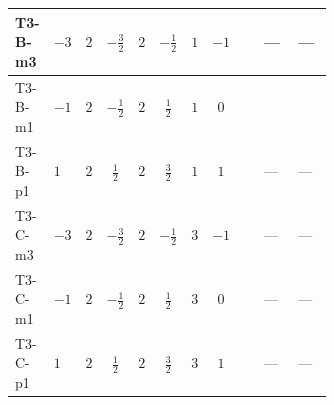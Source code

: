 \documentclass[8pt]{article}
\begin{document}
\begin{landscape}
\begin{longtable}{@{}llcccccc >{\raggedright\arraybackslash}p{0.21\linewidth} >{\raggedright\arraybackslash}p{0.21\linewidth} >{\raggedright\arraybackslash}p{0.21\linewidth}@{}}
\midrule
T3-B-m3 & $-3$ & $2$ & $-\frac{3}{2}$ & $2$ & $-\frac{1}{2}$ & $1$ & $-1$ & \scriptsize\adjustbox{max width=\linewidth}{$\begin{gathered} -\frac{15}{4} {g_1}^2 \left({y_2}\right)_{ij}\end{gathered}$} & --- & --- \\
\midrule
T3-B-m1 & $-1$ & $2$ & $-\frac{1}{2}$ & $2$ & $\frac{1}{2}$ & $1$ & $0$ & \scriptsize\adjustbox{max width=\linewidth}{$\begin{gathered} -\frac{3}{4} {g_1}^2 \left({y_2}\right)_{ij}\end{gathered}$} & \scriptsize\adjustbox{max width=\linewidth}{$\begin{gathered} \operatorname{Tr}\!\left({y_2}\,\left({y_1}\right)^{\dagger}\right) \left({y_1}\right)_{ij}\end{gathered}$} & \scriptsize\adjustbox{max width=\linewidth}{$\begin{gathered} +\frac{1}{2} (\left({y_1}\,\left({y_1}\right)^{\dagger}\,{y_2}\right)_{ij}+2 \left({y_2}\,\left({y_1}\right)^{\dagger}\,{y_1}\right)_{ij}+\left({Y_e}\,\left({Y_e}\right)^{\dagger}\,{y_2}\right)_{ij}+3 \left({y_2}\,\left({y_2}\right)^{\dagger}\,{y_2}\right)_{ij})\end{gathered}$} \\
\midrule
T3-B-p1 & $1$ & $2$ & $\frac{1}{2}$ & $2$ & $\frac{3}{2}$ & $1$ & $1$ & \scriptsize\adjustbox{max width=\linewidth}{$\begin{gathered} -\frac{15}{4} {g_1}^2 \left({y_2}\right)_{ij}\end{gathered}$} & --- & --- \\
\midrule
T3-C-m3 & $-3$ & $2$ & $-\frac{3}{2}$ & $2$ & $-\frac{1}{2}$ & $3$ & $-1$ & \scriptsize\adjustbox{max width=\linewidth}{$\begin{gathered} -\frac{15}{4} {g_1}^2 \left({y_2}\right)_{ij}\end{gathered}$} & --- & --- \\
\midrule
T3-C-m1 & $-1$ & $2$ & $-\frac{1}{2}$ & $2$ & $\frac{1}{2}$ & $3$ & $0$ & \scriptsize\adjustbox{max width=\linewidth}{$\begin{gathered} -\frac{3}{4} {g_1}^2 \left({y_2}\right)_{ij}\end{gathered}$} & --- & --- \\
\midrule
T3-C-p1 & $1$ & $2$ & $\frac{1}{2}$ & $2$ & $\frac{3}{2}$ & $3$ & $1$ & \scriptsize\adjustbox{max width=\linewidth}{$\begin{gathered} -\frac{15}{4} {g_1}^2 \left({y_2}\right)_{ij}\end{gathered}$} & --- & --- \\

\end{longtable}
\end{landscape}
\end{document}
